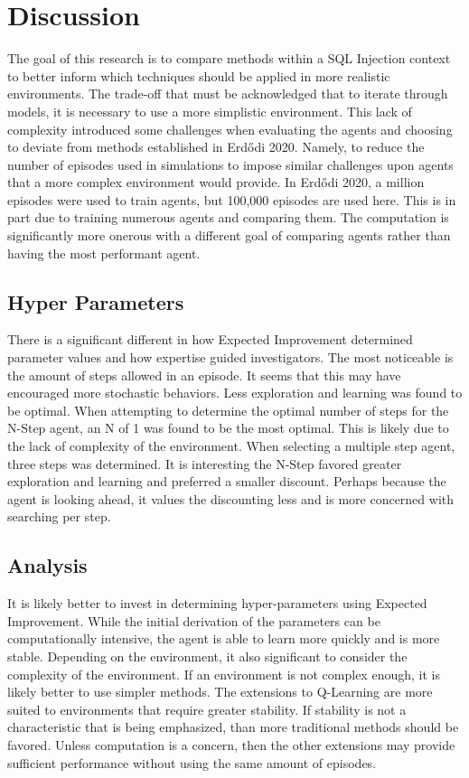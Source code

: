 \documentclass[conference]{IEEEtran}
\begin{document}
\section{Discussion}
The goal of this research is to compare methods within a SQL Injection context to better inform which techniques should be applied in more realistic environments. The trade-off that must be acknowledged that to iterate through models, it is necessary to use a more simplistic environment. This lack of complexity introduced some challenges when evaluating the agents and choosing to deviate from methods established in Erdődi 2020. Namely, to reduce the number of episodes used in simulations to impose similar challenges upon agents that a more complex environment would provide. In Erdődi 2020, a million episodes were used to train agents, but 100,000 episodes are used here. This is in part due to training numerous agents and comparing them. The computation is significantly more onerous with a different goal of comparing agents rather than having the most performant agent. 

\subsection{Hyper Parameters}
There is a significant different in how Expected Improvement determined parameter values and how expertise guided investigators. The most noticeable is the amount of steps allowed in an episode. It seems that this may have encouraged more stochastic behaviors. Less exploration and learning was found to be optimal. When attempting to determine the optimal number of steps for the N-Step agent, an N of 1 was found to be the most optimal. This is likely due to the lack of complexity of the environment. When selecting a multiple step agent, three steps was determined. It is interesting the N-Step favored greater exploration and learning and preferred a smaller discount. Perhaps because the agent is looking ahead, it values the discounting less and is more concerned with searching per step. 

\subsection{Analysis}
It is likely better to invest in determining hyper-parameters using Expected Improvement. While the initial derivation of the parameters can be computationally intensive, the agent is able to learn more quickly and is more stable. Depending on the environment, it also significant to consider the complexity of the environment. If an environment is not complex enough, it is likely better to use simpler methods. The extensions to Q-Learning are more suited to environments that require greater stability. If stability is not a characteristic that is being emphasized, than more traditional methods should be favored. Unless computation is a concern, then the other extensions may provide sufficient performance without using the same amount of episodes.
\end{document}
